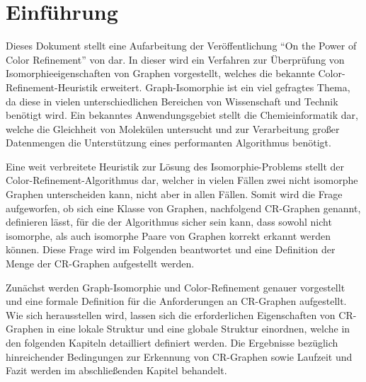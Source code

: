 \section{Einführung}
\label{sec/einfuehrung}

Dieses Dokument stellt eine Aufarbeitung der Veröffentlichung \enquote{On the Power of Color Refinement} von \cite{Arvind2015} dar.
In dieser wird ein Verfahren zur Überprüfung von Isomorphieeigenschaften von Graphen vorgestellt, welches die bekannte Color-Refinement-Heuristik erweitert.
Graph-Isomorphie ist ein viel gefragtes Thema, da diese in vielen unterschiedlichen Bereichen von Wissenschaft und Technik benötigt wird.
Ein bekanntes Anwendungsgebiet stellt die Chemieinformatik dar, welche die Gleichheit von Molekülen untersucht und zur Verarbeitung großer Datenmengen die Unterstützung eines performanten Algorithmus benötigt.

Eine weit verbreitete Heuristik zur Lösung des Isomorphie-Problems stellt der Color-Refinement-Algorithmus dar, welcher in vielen Fällen zwei nicht isomorphe Graphen unterscheiden kann, nicht aber in allen Fällen.
Somit wird die Frage aufgeworfen, ob sich eine Klasse von Graphen, nachfolgend CR-Graphen genannt, definieren lässt, für die der Algorithmus sicher sein kann, dass sowohl nicht isomorphe, als auch isomorphe Paare von Graphen korrekt erkannt werden können.
Diese Frage wird im Folgenden beantwortet und eine Definition der Menge der CR-Graphen aufgestellt werden.

Zunächst werden Graph-Isomorphie und Color-Refinement genauer vorgestellt und eine formale Definition für die Anforderungen an CR-Graphen aufgestellt.
Wie sich herausstellen wird, lassen sich die erforderlichen Eigenschaften von CR-Graphen in eine lokale Struktur und eine globale Struktur einordnen, welche in den folgenden Kapiteln detailliert definiert werden.
Die Ergebnisse bezüglich hinreichender Bedingungen zur Erkennung von CR-Graphen sowie Laufzeit und Fazit werden im abschließenden Kapitel behandelt.